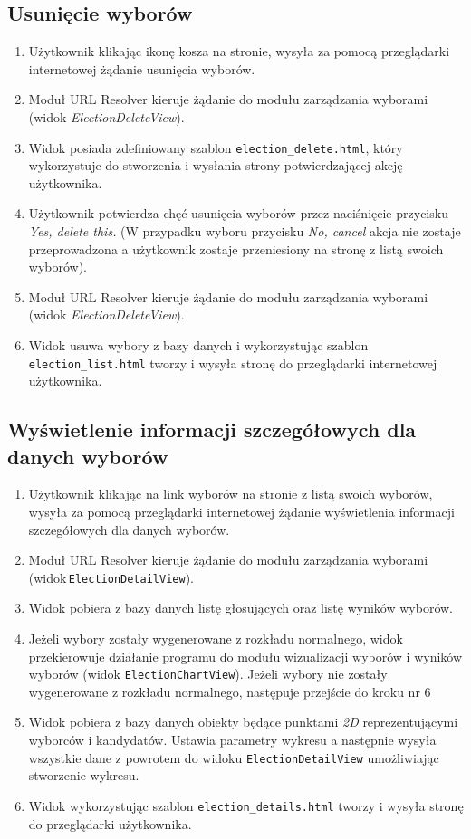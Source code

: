 \documentclass[pdflatex,11pt]{../aghdoc_version2}
\newcommand{\code}[1]{\texttt{#1}}
\begin{document}
\subsection{Usunięcie wyborów}
\begin{enumerate}
\item Użytkownik klikając ikonę kosza na stronie, wysyła za pomocą przeglądarki
internetowej żądanie usunięcia wyborów.
\item Moduł URL Resolver kieruje żądanie do modułu zarządzania wyborami (widok
\textit{ElectionDeleteView}).
\item Widok posiada zdefiniowany szablon \code{election\_delete.html}, który wykorzystuje do
stworzenia i wysłania strony potwierdzającej akcję użytkownika.
\item Użytkownik potwierdza chęć usunięcia wyborów przez naciśnięcie przycisku \textit{Yes,
delete this.} (W przypadku wyboru przycisku \textit{No, cancel} akcja nie zostaje przeprowadzona a użytkownik zostaje przeniesiony na stronę z listą swoich
wyborów).
\item Moduł URL Resolver kieruje żądanie do modułu zarządzania wyborami (widok
\textit{ElectionDeleteView}).
\item Widok usuwa wybory z bazy danych i wykorzystując szablon \code{election\_list.html} tworzy
i wysyła stronę do przeglądarki internetowej użytkownika.
\end{enumerate}

\subsection{Wyświetlenie informacji szczegółowych dla danych wyborów}
\begin{enumerate}
\item Użytkownik klikając na link wyborów na stronie z listą swoich wyborów, wysyła za
pomocą przeglądarki internetowej żądanie wyświetlenia informacji szczegółowych
dla danych wyborów.
\item Moduł URL Resolver kieruje żądanie do modułu zarządzania wyborami\,(widok\,\code{ElectionDetailView}).
\item Widok pobiera z bazy danych listę głosujących oraz listę wyników wyborów.
\item Jeżeli wybory zostały wygenerowane z rozkładu normalnego, widok przekierowuje
działanie programu do modułu wizualizacji wyborów i wyników wyborów (widok
\code{ElectionChartView}). Jeżeli wybory nie zostały wygenerowane z rozkładu normalnego, następuje przejście do kroku nr $6$
\item Widok pobiera z bazy danych obiekty będące punktami \textit{2D} reprezentującymi
wyborców i kandydatów. Ustawia parametry wykresu a następnie wysyła wszystkie
dane z powrotem do widoku \code{ElectionDetailView} umożliwiając stworzenie wykresu.
\item Widok wykorzystując szablon \code{election\_details.html} tworzy i wysyła stronę do
przeglądarki użytkownika.
\end{enumerate}
\clearpage
\end{document}
